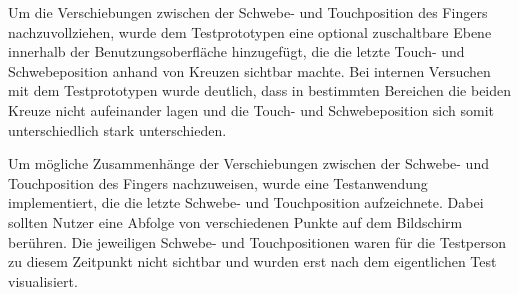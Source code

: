 \documentclass[a4paper,12pt,bibliography=totoc]{scrreprt}%
\begin{document}
Um die Verschiebungen zwischen der Schwebe- und Touchposition des Fingers nachzuvollziehen, wurde dem Testprototypen eine optional zuschaltbare Ebene innerhalb der Benutzungsoberfläche hinzugefügt, die die letzte Touch- und Schwebeposition anhand von Kreuzen sichtbar machte. Bei internen Versuchen mit dem Testprototypen wurde deutlich, dass in bestimmten Bereichen die beiden Kreuze nicht aufeinander lagen und die Touch- und Schwebeposition sich somit unterschiedlich stark unterschieden.

Um mögliche Zusammenhänge der Verschiebungen zwischen der Schwebe- und Touchposition des Fingers nachzuweisen, wurde eine Testanwendung implementiert, die die letzte Schwebe- und Touchposition aufzeichnete. Dabei sollten Nutzer eine Abfolge von verschiedenen Punkte auf dem Bildschirm berühren. Die jeweiligen Schwebe- und Touchpositionen waren für die Testperson zu diesem Zeitpunkt nicht sichtbar und wurden erst nach dem eigentlichen Test visualisiert.
\end{document}
